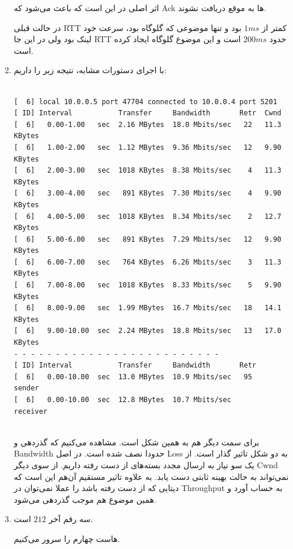\documentclass[12pt]{article}
\begin{document}
\begin{enumerate}
اثر اصلی  در این است که باعث می‌شود که Ack ها به موقع دریافت نشوند.

در حالت قبلی RTT کمتر از $1ms$ بود و تنها موضوعی که گلوگاه بود، سرعت خود لینک بود ولی در این جا RTT حدود $200ms$ است و این موضوع گلوگاه ایجاد کرده است.

\item


با اجرای دستورات مشابه، نتیجه زیر را داریم:

\begin{latin}
	\begin{Verbatim}

[  6] local 10.0.0.5 port 47704 connected to 10.0.0.4 port 5201
[ ID] Interval           Transfer     Bandwidth       Retr  Cwnd
[  6]   0.00-1.00   sec  2.16 MBytes  18.0 Mbits/sec   22   11.3 KBytes       
[  6]   1.00-2.00   sec  1.12 MBytes  9.36 Mbits/sec   12   9.90 KBytes       
[  6]   2.00-3.00   sec  1018 KBytes  8.38 Mbits/sec    4   11.3 KBytes       
[  6]   3.00-4.00   sec   891 KBytes  7.30 Mbits/sec    4   9.90 KBytes       
[  6]   4.00-5.00   sec  1018 KBytes  8.34 Mbits/sec    2   12.7 KBytes       
[  6]   5.00-6.00   sec   891 KBytes  7.29 Mbits/sec   12   9.90 KBytes       
[  6]   6.00-7.00   sec   764 KBytes  6.26 Mbits/sec    3   11.3 KBytes       
[  6]   7.00-8.00   sec  1018 KBytes  8.33 Mbits/sec    5   9.90 KBytes       
[  6]   8.00-9.00   sec  1.99 MBytes  16.7 Mbits/sec   18   14.1 KBytes       
[  6]   9.00-10.00  sec  2.24 MBytes  18.8 Mbits/sec   13   17.0 KBytes       
- - - - - - - - - - - - - - - - - - - - - - - - -
[ ID] Interval           Transfer     Bandwidth       Retr
[  6]   0.00-10.00  sec  13.0 MBytes  10.9 Mbits/sec   95             sender
[  6]   0.00-10.00  sec  12.8 MBytes  10.7 Mbits/sec                  receiver


	\end{Verbatim}
\end{latin}


برای سمت دیگر هم به همین شکل است. مشاهده‌ می‌کنیم که گذردهی و Bandwidth حدودا نصف شده است. 
در اصل Loss به دو شکل تاثیر گذار است. از یک سو نیاز به ارسال مجدد بسته‌های از دست رفته داریم. از سوی دیگر Cwnd نمی‌تواند به حالت بهینه ثابتی دست یابد. به علاوه تاثیر مستقیم آن‌هم این است که دیتایی که از دست رفته باشد را عملا نمی‌توان در Throughput به حساب آورد و همین موضوع هم موجب گذردهی می‌شود.


\item

سه رقم آخر $212$ است.

هاست چهارم را سرور می‌کنیم.


\end{enumerate}
\end{document}
